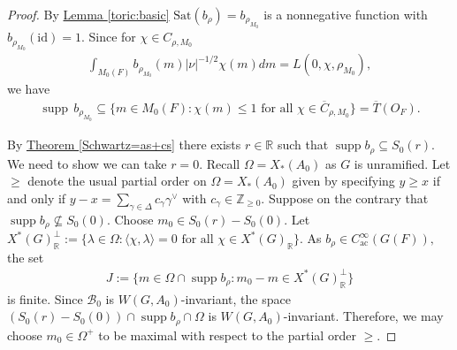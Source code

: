 \documentclass[10pt]{amsart}
\theoremstyle{definition}
\numberwithin{equation}{section}
\DeclareMathOperator{\supp}{\mathrm{supp}}
\numberwithin{equation}{subsection}
\newcommand{\RR}{\mathbb{R}}
\begin{document}
\begin{proof}
 By \hyperref[toric:basic]{Lemma \ref{toric:basic}} $\mathrm{Sat}(b_\rho) = b_{\rho_{M_0}}$ is a nonnegative function with $b_{\rho_{M_0}}(\mathrm{id})=1.$ Since for $\chi\in C_{\rho,M_0}$
 \begin{align*}
    \int_{M_0(F)}b_{\rho_{M_0}}(m) |\nu|^{-1/2}\chi(m)dm=L(0,\chi,\rho_{M_0}),
 \end{align*}
we have
\begin{align*}
    \supp\, b_{\rho_{M_0}}\subseteq \{ m\in M_0(F): \chi(m)\le 1 \textrm{ for all } \chi\in \overline{C}_{\rho,M_0} \}=\overline{T}(O_F).
\end{align*}

By \hyperref[Schwartz=as+cs]{Theorem \ref{Schwartz=as+cs}} there exists $r\in \RR$ such that $\supp b_\rho \subseteq S_0(r).$ We need to show we can take $r=0$. Recall $\Omega=X_\ast(A_0)$ as $G$ is unramified. Let $\ge$ denote the usual partial order on $\Omega=X_*(A_0)$ given by specifying $y\ge x $ if and only if $y-x = \sum_{\gamma\in \Delta}c_\gamma\gamma^\vee$ with $c_\gamma\in \mathbb{Z}_{\geq 0}.$ Suppose on the contrary that $\supp b_\rho \not\subseteq S_0(0).$ Choose $m_0\in S_0(r)-S_0(0).$ Let $X^\ast(G)_\RR^\perp:=\{\lambda\in \Omega: \langle \chi,\lambda\rangle = 0\text{ for all }\chi\in X^*(G)_\RR\}.$ As $b_\rho\in C^\infty_{\mathrm{ac}}(G(F)),$ the set 
\begin{align*}
    J:=\{m\in \Omega\cap \supp b_\rho: m_0 - m\in X^\ast(G)_\RR^\perp\}
\end{align*}
is finite. Since $\mathcal{B}_0$ is $W(G,A_0)$-invariant, the space $(S_0(r)-S_0(0))\cap \supp b_\rho\cap \Omega$ is $W(G,A_0)$-invariant. Therefore, we may choose $m_0\in \Omega^+$ to be maximal with respect to the partial order $\ge$.


\end{proof}
\end{document}
